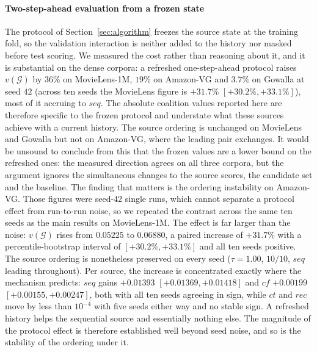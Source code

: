 \documentclass[pdflatex,sn-basic,Numbered]{sn-jnl}
\theoremstyle{plain}
\theoremstyle{definition}
\newcommand{\G}{\mathcal{G}}
\begin{document}
\paragraph{Two-step-ahead evaluation from a frozen state}
The protocol of Section~\ref{sec:algorithm} freezes the source state at the
training fold, so the validation interaction is neither added to the history
nor masked before test scoring. We measured the cost rather than reasoning
about it, and it is substantial on the dense corpora: a refreshed
one-step-ahead protocol raises $v(\G)$ by $36\%$ on MovieLens-1M, $19\%$ on
Amazon-VG and $3.7\%$ on Gowalla at seed $42$ (across ten seeds the MovieLens
figure is $+31.7\%$ $[+30.2\%,+33.1\%]$), most of it accruing to $seq$. The absolute
coalition values reported here are therefore specific to the frozen protocol
and understate what these sources achieve with a current history. The source
ordering is unchanged on MovieLens and Gowalla but not on Amazon-VG, where the
leading pair exchanges. It would be unsound to conclude from this that the
frozen values are a lower bound on the refreshed ones: the measured direction
agrees on all three corpora, but the argument ignores the simultaneous changes
to the source scores, the candidate set and the baseline. The finding that
matters is the ordering instability on Amazon-VG. Those figures were seed-42
single runs, which cannot separate a protocol effect from run-to-run noise, so
we repeated the contrast across the same ten seeds as the main results on
MovieLens-1M. The effect is far larger than the noise: $v(\G)$ rises from
$0.05225$ to $0.06880$, a paired increase of $+31.7\%$ with a
percentile-bootstrap interval of $[+30.2\%,+33.1\%]$ and all ten seeds
positive. The source ordering is nonetheless preserved on every seed
($\tau = 1.00$, $10/10$, $seq$ leading throughout). Per source, the increase
is concentrated exactly where the mechanism predicts: $seq$ gains
$+0.01393$ $[+0.01369,+0.01418]$ and $cf$ $+0.00199$
$[+0.00155,+0.00247]$, both with all ten seeds agreeing in sign, while $ct$
and $rec$ move by less than $10^{-4}$ with five seeds either way and no stable
sign. A refreshed history helps the sequential source and essentially nothing
else. The magnitude of the protocol effect is therefore established well
beyond seed noise, and so is the stability of the ordering under it.
\end{document}
